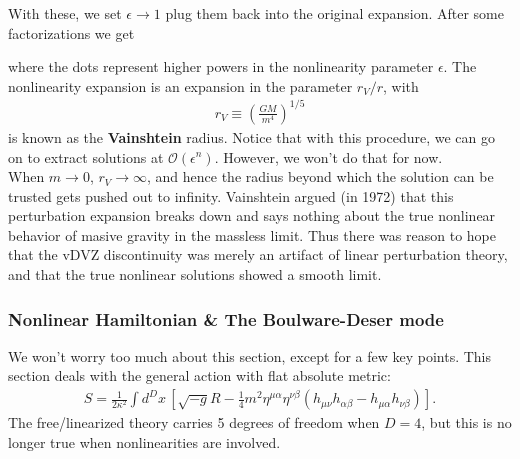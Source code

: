 \documentclass{book}
\theoremstyle{definition}
\newcommand*\widefbox[1]{\fbox{\hspace{2em}#1\hspace{2em}}}
\newcommand{\nn}{\nonumber}
\newcommand{\al}{\alpha}
\newcommand{\be}{\beta}
\newcommand{\f}[2]{\frac{#1}{#2}}
\newcommand{\lp}{\left(}
\newcommand{\rp}{\right)}
\newcommand{\lb}{\left[}
\newcommand{\rb}{\right]}
\begin{document}
\newpage

With these, we set $\epsilon \to 1$ plug them back into the original expansion. After some factorizations we get

where the dots represent higher powers in the nonlinearity parameter $\epsilon$. The nonlinearity expansion is an expansion in the parameter $r_V/r$, with
\begin{align}
\boxed{r_V \equiv \lp \f{GM}{m^4} \rp^{1/5}}
\end{align}
is known as the \textbf{Vainshtein} radius. Notice that with this procedure, we can go on to extract solutions at $\mathcal{O}(\epsilon^n)$. However, we won't do that for now.\\







When $m\to 0$, $r_V \to \infty$, and hence the radius beyond which the solution can be trusted gets pushed out to infinity. Vainshtein argued (in 1972) that this perturbation expansion breaks down and says nothing about the true nonlinear behavior of masive gravity in the massless limit. Thus there was reason to hope that the vDVZ discontinuity was merely an artifact of linear perturbation theory, and that the true nonlinear solutions showed a smooth limit. 



\newpage
\subsubsection{Nonlinear Hamiltonian \& The Boulware-Deser mode}

We won't worry too much about this section, except for a few key points. This section deals with the general action with flat absolute metric:
\begin{align}
S = \f{1}{2\kappa^2}\int d^Dx\, \lb \sqrt{-g}R - \f{1}{4}m^2\eta^{\mu\al}\eta^{\nu\beta}\lp h_{\mu\nu}h_{\al\be} - h_{\mu\al}h_{\nu\be}  \rp \rb.
\end{align} 
The free/linearized theory carries 5 degrees of freedom when $D=4$, but this is no longer true when nonlinearities are involved. \\
\end{document}
